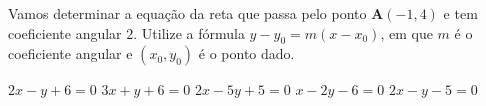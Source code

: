 Vamos determinar a equação da reta que passa pelo ponto $ \mathbf{A}(-1, 4) $ e tem coeficiente angular $ 2 $. Utilize a fórmula $y-y_0=m(x-x_0)$, em que $m$ é o coeficiente angular e $(x_0,y_0)$ é o ponto dado.

$2x - y + 6 = 0$
$3x + y + 6 = 0$
$2x - 5y + 5 = 0$
$x - 2y - 6 = 0$
$2x - y - 5 = 0$






